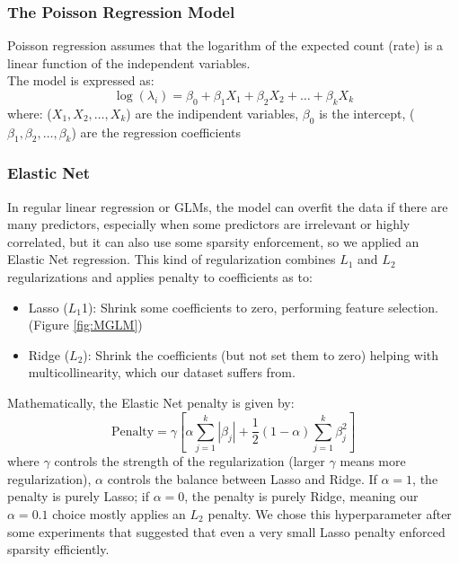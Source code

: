 \documentclass[a4paper, 9pt]{article}
\begin{document}
\begin{multicols}{2}
\subsubsection*{The Poisson Regression Model}
Poisson regression assumes that the logarithm of the expected count (rate) is a linear function of the independent variables.\\
The model is expressed as:
\begin{equation}
\log(\lambda_i)=\beta_0+\beta_1X_1+\beta_2X_2+\dots+\beta_kX_k
\end{equation}
where: ($X_1, X_2,\dots,X_k$) are the indipendent variables, $\beta_0$ is the intercept, ($\beta_1,\beta_2, \dots, \beta_k$) are the regression coefficients
\subsubsection*{Elastic Net}
In regular linear regression or GLMs, the model can overfit the data if there are many predictors, especially when some predictors are irrelevant or highly correlated, but it can also use some sparsity enforcement, so we applied an Elastic Net regression. This kind of regularization combines $L_1$ and $L_2$ regularizations and applies penalty to coefficients as to: 
\begin{itemize}
\item Lasso ($L_1$1): Shrink some coefficients to zero, performing feature selection.(Figure \ref{fig:MGLM})
\item Ridge ($L_2$): Shrink the coefficients (but not set them to zero) helping with multicollinearity, which our dataset suffers from.
\end{itemize}
Mathematically, the Elastic Net penalty is given by:
\begin{equation}
\text{Penalty}= \gamma \left[\alpha \sum_{j=1}^k|\beta_j| + \frac{1}{2}(1-\alpha)\sum_{j=1}^k\beta_{j}^{2} \right]
\end{equation} 
where $\gamma$ controls the strength of the regularization (larger $\gamma$ means more regularization), $\alpha$ controls the balance between Lasso and Ridge. If $\alpha=1$, the penalty is purely Lasso; if $\alpha=0$, the penalty is purely Ridge, meaning our $\alpha = 0.1$ choice mostly applies an $L_2$ penalty. We chose this hyperparameter after some experiments that suggested that even a very small Lasso penalty enforced sparsity efficiently.

\end{multicols}
\end{document}
